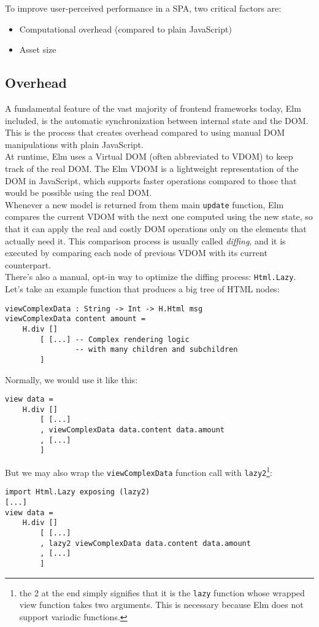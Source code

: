 To improve user-perceived performance in a SPA, two critical factors are:
\begin{itemize}
    \item Computational overhead (compared to plain JavaScript)
    \item Asset size
\end{itemize}

\subsection{Overhead}
A fundamental feature of the vast majority of frontend frameworks today, Elm included, is the automatic synchronization between internal state and the DOM. This is the process that creates overhead compared to using manual DOM manipulations with plain JavaScript.\\

At runtime, Elm uses a Virtual DOM (often abbreviated to VDOM) to keep track of the real DOM. The Elm VDOM is a lightweight representation of the DOM in JavaScript, which supports faster operations compared to those that would be possible using the real DOM. \cite{noauthor_htmllazy_nodate}\\

Whenever a new model is returned from them main \texttt{update} function, Elm compares the current VDOM with the next one computed using the new state, so that it can apply the real and costly DOM operations only on the elements that actually need it. This comparison process is usually called \textit{diffing}, and it is executed by comparing each node of previous VDOM with its current counterpart.\\

There's also a manual, opt-in way to optimize the diffing process: \texttt{Html.Lazy}. Let's take an example function that produces a big tree of HTML nodes:
\begin{verbatim}
viewComplexData : String -> Int -> H.Html msg
viewComplexData content amount =
    H.div []
        [ [...] -- Complex rendering logic 
                -- with many children and subchildren
        ]
\end{verbatim}

Normally, we would use it like this:
\begin{verbatim}
view data =
    H.div []
        [ [...]
        , viewComplexData data.content data.amount
        , [...]
        ]
\end{verbatim}

But we may also wrap the \texttt{viewComplexData} function call with \texttt{lazy2}\footnote[1]{the 2 at the end simply signifies that it is the \texttt{lazy} function whose wrapped view function takes two arguments. This is necessary because Elm does not support variadic functions.}:
\begin{verbatim}
import Html.Lazy exposing (lazy2)
[...]
view data =
    H.div []
        [ [...]
        , lazy2 viewComplexData data.content data.amount
        , [...]
        ]
\end{verbatim}


